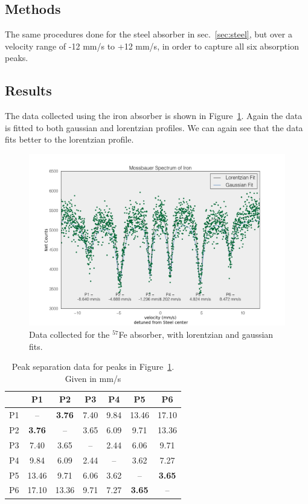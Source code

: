 \documentclass[paper=a4, fontsize=11pt, abstract=on]{scrartcl} %
\numberwithin{equation}{section}
\numberwithin{figure}{section}
\numberwithin{table}{section}
\begin{document}
\subsection{Methods}
\label{sec:irmeth}

The same procedures done for the steel absorber in
sec.~\ref{sec:steel}, but over a velocity range of -12 mm/s to +12
mm/s, in order to capture all six absorption peaks.

\subsection{Results}
\label{sec:irres}

The data collected using the iron absorber is shown in
Figure~\ref{fig:iron}. Again the data is fitted to both gaussian and
lorentzian profiles. We can again see that the data fits better to the
lorentzian profile. 

\begin{figure}[h]
  \centering
  \includegraphics[width=.9\textwidth]{ironfit}
  \caption{Data collected for the $^{57}$Fe absorber, with lorentzian and gaussian fits.}
  \label{fig:iron}
\end{figure}

\begin{table}[h]
  \centering
  \begin{tabular}{r|cccccc}
       & P1 & P2 & P3 & P4 & P5 & P6 \\ \hline
    P1 & --   & \textbf{3.76}  & 7.40  & 9.84 & 13.46  & 17.10    \\
    P2 & \textbf{3.76}   & --  &  3.65   & 6.09  & 9.71 & 13.36   \\
    P3 & 7.40   & 3.65   & --  & 2.44  & 6.06   & 9.71   \\
    P4 & 9.84   & 6.09   & 2.44   & -- & 3.62   & 7.27  \\
    P5 & 13.46   & 9.71   & 6.06   & 3.62   & -- & \textbf{3.65} \\ 
    P6 & 17.10   & 13.36   & 9.71   & 7.27   & \textbf{3.65} & --  \\
  \end{tabular}
  \caption{Peak separation data for peaks in
    Figure~\ref{fig:iron}. Given in mm/s}
  \label{tab:sep}
\end{table}
\end{document}
